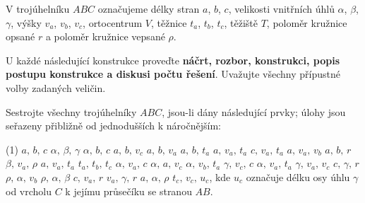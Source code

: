 \documentclass[12pt,a4paper]{article}
\begin{document}
\begin{exercise}

    V trojúhelníku $ABC$ označujeme délky stran $a$, $b$, $c$, velikosti vnitřních úhlů
    $\alpha$, $\beta$, $\gamma$, výšky $v_a$, $v_b$, $v_c$, ortocentrum $V$,
    těžnice $t_a$, $t_b$, $t_c$, těžiště $T$, poloměr kružnice opsané $r$
    a poloměr kružnice vepsané $\rho$.

    U každé následující konstrukce proveďte \textbf{náčrt, rozbor, konstrukci, popis postupu konstrukce
    a diskusi počtu řešení}. Uvažujte všechny přípustné volby zadaných veličin.

    Sestrojte všechny trojúhelníky $ABC$, jsou-li dány následující prvky; úlohy jsou seřazeny
    přibližně od jednodušších k náročnějším:

    \begin{tasks}(1)
        \task $a,\,b,\,c$
        \task $\alpha,\,\beta,\,\gamma$
        \task $\alpha,\,b,\,c$
        \task $a,\,b,\,v_c$
        \task $a,\,b,\,v_a$
        \task $a,\,b,\,t_a$
        \task $a,\,v_a,\,t_a$
        \task $c,\,v_a,\,t_a$
        \task $a,\,v_a,\,v_b$
        \task $a,\,b,\,r$
        \task $\beta,\,v_a,\,\rho$
        \task $a,\,v_a,\,t_a$
        \task $t_a,\,t_b,\,t_c$
        \task $\alpha,\,v_a,\,c$
        \task $\alpha,\,a,\,v_c$
        \task $\alpha,\,v_b,\,t_a$
        \task $\gamma,\,v_c,\,c$
        \task $\alpha,\,v_a,\,t_a$
        \task $\gamma,\,v_a,\,v_c$
        \task $c,\,\gamma,\,r$
        \task $\rho,\,\alpha,\,v_b$
        \task $\rho,\,\alpha,\,\beta$
        \task $c,\,v_a,\,r$
        \task $v_a,\,\gamma,\,r$
        \task $a,\,\alpha,\,\rho$
        \task $t_c,\,v_c,\,u_c$, kde $u_c$ označuje délku osy úhlu $\gamma$ od vrcholu $C$
        k jejímu průsečíku se stranou $AB$.
    \end{tasks}

\end{exercise}



\setcounter{section}{7}

\end{document}
